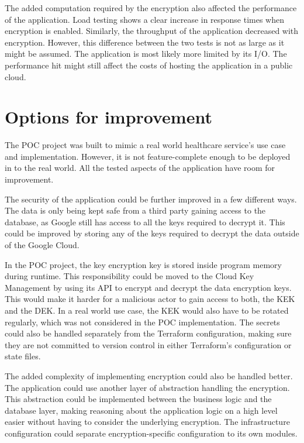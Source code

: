 The added computation required by the encryption also affected the performance of the application.
Load testing shows a clear increase in response times when encryption is enabled.
Similarly, the throughput of the application decreased with encryption.
However, this difference between the two tests is not as large as it might be assumed.
The application is most likely more limited by its I/O.
The performance hit might still affect the costs of hosting the application in a public cloud.

\section{Options for improvement}

The POC project was built to mimic a real world healthcare service’s use case and implementation.
However, it is not feature-complete enough to be deployed in to the real world.
All the tested aspects of the application have room for improvement.

The security of the application could be further improved in a few different ways.
The data is only being kept safe from a third party gaining access to the database, as Google still has access to all the keys required to decrypt it.
This could be improved by storing any of the keys required to decrypt the data outside of the Google Cloud.

In the POC project, the key encryption key is stored inside program memory during runtime.
This responsibility could be moved to the Cloud Key Management by using its API to encrypt and decrypt the data encryption keys.
This would make it harder for a malicious actor to gain access to both, the KEK and the DEK.
In a real world use case, the KEK would also have to be rotated regularly, which was not considered in the POC implementation.
The secrets could also be handled separately from the Terraform configuration, making sure they are not committed to version control in either Terraform’s configuration or state files.

The added complexity of implementing encryption could also be handled better.
The application could use another layer of abstraction handling the encryption.
This abstraction could be implemented between the business logic and the database layer, making reasoning about the application logic on a high level easier without having to consider the underlying encryption.
The infrastructure configuration could separate encryption-specific configuration to its own modules.

